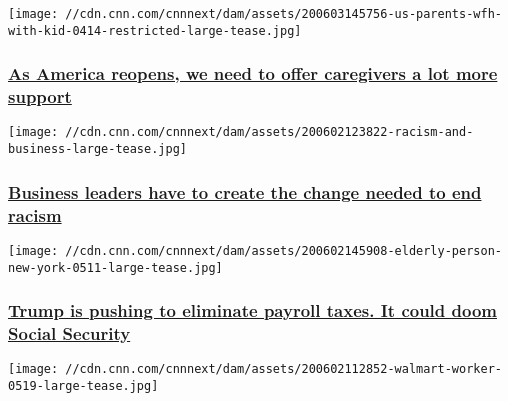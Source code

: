 \texttt{[image: //cdn.cnn.com/cnnnext/dam/assets/200603145756-us-parents-wfh-with-kid-0414-restricted-large-tease.jpg]}

\hypertarget{as-america-reopens-we-need-to-offer-caregivers-a-lot-more-support}{%
\subsubsection{\texorpdfstring{\href{/2020/06/04/perspectives/caregivers-reopen-offices/index.html}{As
America reopens, we need to offer caregivers a lot more
support}}{As America reopens, we need to offer caregivers a lot more support}}\label{as-america-reopens-we-need-to-offer-caregivers-a-lot-more-support}}

\href{/2020/06/03/perspectives/systemic-racism-business-leaders/index.html}{}

\texttt{[image: //cdn.cnn.com/cnnnext/dam/assets/200602123822-racism-and-business-large-tease.jpg]}

\hypertarget{business-leaders-have-to-create-the-change-needed-to-end-racism}{%
\subsubsection{\texorpdfstring{\href{/2020/06/03/perspectives/systemic-racism-business-leaders/index.html}{Business
leaders have to create the change needed to end
racism}}{Business leaders have to create the change needed to end racism}}\label{business-leaders-have-to-create-the-change-needed-to-end-racism}}

\href{/2020/06/03/perspectives/payroll-tax-cut-trump/index.html}{}

\texttt{[image: //cdn.cnn.com/cnnnext/dam/assets/200602145908-elderly-person-new-york-0511-large-tease.jpg]}

\hypertarget{trump-is-pushing-to-eliminate-payroll-taxes-it-could-doom-social-security}{%
\subsubsection{\texorpdfstring{\href{/2020/06/03/perspectives/payroll-tax-cut-trump/index.html}{Trump
is pushing to eliminate payroll taxes. It could doom Social
Security}}{Trump is pushing to eliminate payroll taxes. It could doom Social Security}}\label{trump-is-pushing-to-eliminate-payroll-taxes-it-could-doom-social-security}}

\href{/2020/06/02/perspectives/walmart-hourly-board/index.html}{}

\texttt{[image: //cdn.cnn.com/cnnnext/dam/assets/200602112852-walmart-worker-0519-large-tease.jpg]}

